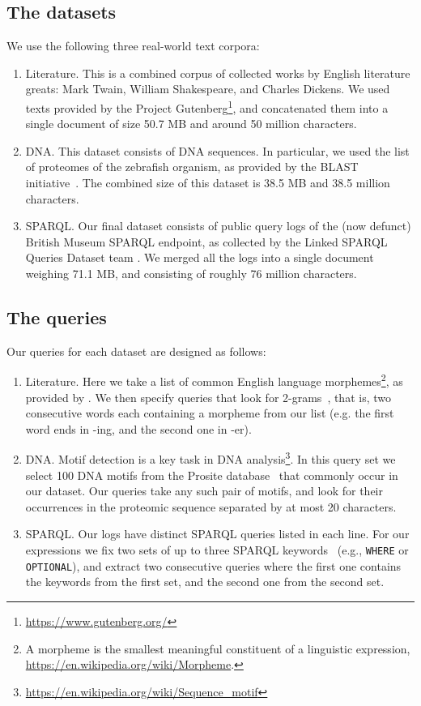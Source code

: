 \subsection{The datasets}
We use the following three real-world text corpora:
\begin{enumerate}
	\item \textsf{Literature.}  This is a combined corpus of collected works by English literature greats: Mark Twain, William Shakespeare, and Charles Dickens. We used texts provided by the Project Gutenberg\footnote{\url{https://www.gutenberg.org/}}, and concatenated them into a single document of size 50.7 MB and around 50 million characters.
	\item \textsf{DNA.} This dataset consists of DNA sequences. In particular, we used the list of proteomes of the zebrafish organism, as provided by the BLAST initiative~\cite{blast}. The combined size of this dataset is 38.5 MB and 38.5 million characters.
	\item \textsf{SPARQL.} Our final dataset consists of public query logs of the (now defunct) British Museum SPARQL endpoint, as collected by the Linked SPARQL Queries Dataset team \cite{LSQ}. We merged all the logs into a single document weighing 71.1 MB, and consisting of roughly 76 million characters.
\end{enumerate}

\subsection{The queries}
Our queries for each dataset are designed as follows:
\begin{enumerate}
	\item \textsf{Literature.} Here we take a list of common English language morphemes\footnote{A morpheme is the smallest meaningful constituent of a linguistic expression, \url{https://en.wikipedia.org/wiki/Morpheme}.}, as provided by \cite{morphemes}.
	We then specify queries that look for 2-grams~\cite{morphemes}, that is, two consecutive words each containing a morpheme from our list (e.g. the first word ends in -ing, and the second one in -er).
	\item \textsf{DNA.} Motif detection is a key task in DNA analysis\footnote{\url{https://en.wikipedia.org/wiki/Sequence_motif}}. In this query set we select 100 DNA motifs from the Prosite database~\cite{prosite} that commonly occur in our dataset. Our queries take any such pair of motifs, and look for their occurrences in the proteomic sequence separated by at most 20 characters.
	\item \textsf{SPARQL.} Our  logs have distinct SPARQL queries listed in each line. For our expressions we fix two sets of up to three SPARQL keywords~\cite{sparql11} (e.g., \texttt{WHERE} or \texttt{OPTIONAL}), and extract two consecutive queries where the first one contains the keywords from the first set, and the second one from the second set. 
\end{enumerate}

